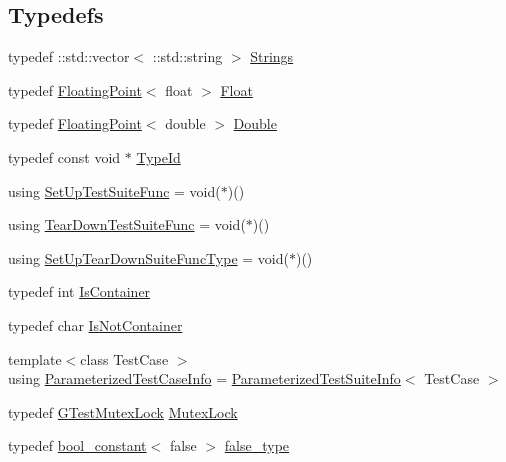 \subsection*{Typedefs}
\begin{DoxyCompactItemize}
\item 
typedef \+::std\+::vector$<$ \+::std\+::string $>$ \hyperlink{namespacetesting_1_1internal_a50003bb76ec2934be1062be11efba8bf}{Strings}
\item 
typedef \hyperlink{classtesting_1_1internal_1_1FloatingPoint}{Floating\+Point}$<$ float $>$ \hyperlink{namespacetesting_1_1internal_a02e1981f5ff70609e6ac06e006ff519a}{Float}
\item 
typedef \hyperlink{classtesting_1_1internal_1_1FloatingPoint}{Floating\+Point}$<$ double $>$ \hyperlink{namespacetesting_1_1internal_a66a7579b1893b260c31dad577f7a5c48}{Double}
\item 
typedef const void $\ast$ \hyperlink{namespacetesting_1_1internal_ab1114197d3c657d8b7f8e0c5caa12d00}{Type\+Id}
\item 
using \hyperlink{namespacetesting_1_1internal_a83e4e0732ac6a9dcfe6ee299dc1b9fa2}{Set\+Up\+Test\+Suite\+Func} = void($\ast$)()
\item 
using \hyperlink{namespacetesting_1_1internal_a8257a87aa42cebaa54b0c48a6ae657a5}{Tear\+Down\+Test\+Suite\+Func} = void($\ast$)()
\item 
using \hyperlink{namespacetesting_1_1internal_a04786aa10f8b0bf38a5ead94d00475f4}{Set\+Up\+Tear\+Down\+Suite\+Func\+Type} = void($\ast$)()
\item 
typedef int \hyperlink{namespacetesting_1_1internal_ad8f0c2883245f1df2a53618a49f0deb3}{Is\+Container}
\item 
typedef char \hyperlink{namespacetesting_1_1internal_abf080521ce135deb510e0a7830fd3d33}{Is\+Not\+Container}
\item 
{\footnotesize template$<$class Test\+Case $>$ }\\using \hyperlink{namespacetesting_1_1internal_aac31682b6b41997d6cc610a5787dc8bc}{Parameterized\+Test\+Case\+Info} = \hyperlink{classtesting_1_1internal_1_1ParameterizedTestSuiteInfo}{Parameterized\+Test\+Suite\+Info}$<$ Test\+Case $>$
\item 
typedef \hyperlink{classtesting_1_1internal_1_1GTestMutexLock}{G\+Test\+Mutex\+Lock} \hyperlink{namespacetesting_1_1internal_a08b187c6cc4e28400aadf9a32fccc8de}{Mutex\+Lock}
\item 
typedef \hyperlink{structtesting_1_1internal_1_1bool__constant}{bool\+\_\+constant}$<$ false $>$ \hyperlink{namespacetesting_1_1internal_abb1d0789f19bdde21affccbd1078b525}{false\+\_\+type}

\end{DoxyCompactItemize}
